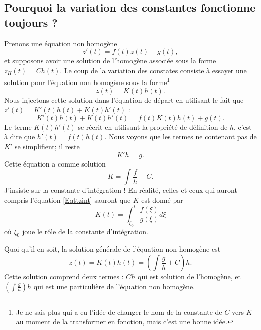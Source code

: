 \subsection{Pourquoi la variation des constantes fonctionne toujours ?}

Prenons une équation non homogène 
\begin{equation}        \label{EqAstNNHomo}
    z'(t)=f(t)z(t)+g(t),
\end{equation}
et supposons avoir une solution de l'homogène associée sous la forme $z_H(t)=Ch(t)$. Le coup de la variation des constates consiste à essayer une solution pour l'équation non homogène sous la forme\footnote{Je ne sais plus qui a eu l'idée de changer le nom de la constante de $C$ vers $K$ au moment de la transformer en fonction, mais c'est une bonne idée.}
\begin{equation}
    z(t)=K(t)h(t).
\end{equation}
Nous injectons cette solution dans l'équation de départ en utilisant le fait que $z'(t)=K'(t)h(t)+K(t)h'(t)$ :
\begin{equation}
    K'(t)h(t)+K(t)h'(t)=f(t)K(t)h(t)+g(t).
\end{equation}
Le terme $K(t)h'(t)$ se récrit en utilisant la propriété de définition de $h$, c'est à dire que $h'(t)=f(t)h(t)$. Nous voyons que les termes ne contenant pas de $K'$ se simplifient; il reste
\begin{equation}
    K'h=g.
\end{equation}
Cette équation a comme solution
\begin{equation}
    K=\int \frac{ f }{ h }+C.
\end{equation}
J'insiste sur la constante d'intégration ! En réalité, celles et ceux qui auront compris l'équation \eqref{Eqttzint} sauront que $K$ est donné par
\begin{equation}
    K(t)=\int_{\xi_0}^{t}\frac{ f(\xi) }{ g(\xi) }d\xi
\end{equation}
où $\xi_0$ joue le rôle de la constante d'intégration.

Quoi qu'il en soit, la solution générale de l'équation non homogène est
\begin{equation}        \label{EqSolVarCosntCool}
    z(t)=K(t)h(t)=\left( \int\frac{ g }{ h }+C \right)h.
\end{equation}
Cette solution comprend deux termes : $Ch$ qui est solution de l'homogène, et $\left( \int \frac{ g }{ h } \right)h$ qui est une particulière de l'équation non homogène.

